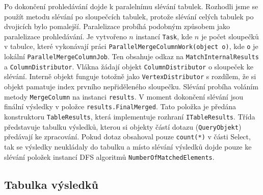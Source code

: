 Po dokončení prohledávání dojde k paralelnímu slévání tabulek.
Rozhodli jsme se použít metodu slévání po sloupečcích tabulek, protože slévání celých tabulek po dvojicích bylo pomalejší.
Paralelizace probíhá podobným způsobem jako paralelizace prohledávání.
Je vytvořeno $n$ instancí \texttt{Task}, kde $n$ je počet sloupečků v tabulce, které vykonávají práci \texttt{ParallelMergeColumnWork(object o)}, kde \texttt{o} je lokální \texttt{ParallelMergeColumnJob}.
Ten obsahuje odkaz na \texttt{MatchInternalResults} a \texttt{ColumnDistributor}.
Vlákna žádají objekt \texttt{ColumnDistributor} o sloupeček ke slévání.
Interně objekt funguje totožně jako \texttt{VertexDistributor} s rozdílem, že si objekt pamatuje index prvního nepřiděleného sloupečku.
Slévání probíha voláním metody \texttt{MergeColumn} na instanci \texttt{results}.
V moment dokončení slévání jsou finální výsledky v položce \texttt{results.FinalMerged}.
Tato položka je předána konstruktoru \texttt{TableResults}, která implementuje rozhraní \texttt{ITableResults}.
Třída představuje tabulku výsledků, kterou si objekty částí dotazu (\texttt{QueryObjekt}) předávají ke zpracování.
Pokud dotaz obsahoval pouze \texttt{count(*)} v části Select, tak se výsledky neukládaly do tabulku a místo slévání výsledků dojde pouze ke slévání položek instancí DFS algoritmů \texttt{NumberOfMatchedElements}.

\subsection{Tabulka výsledků} \label{impl.table}

